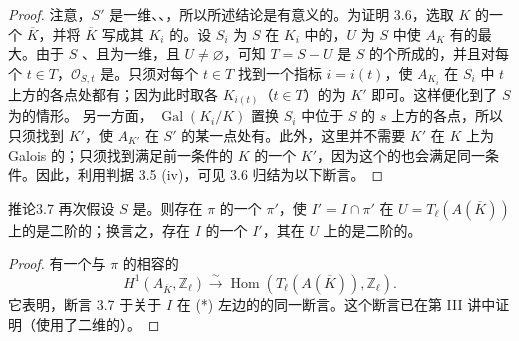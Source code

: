 \begin{proof}
注意，$S'$ 是一维、、，所以所述结论是有意义的。为证明 3.6，选取 $K$ 的一个 $\overline K$，并将 $\overline K$ 写成其 $K_i$ 的。设 $S_i$ 为 $S$ 在 $K_i$ 中的，$U$ 为 $S$ 中使 $A_K$ 有的最大。由于 $S$ 、且为一维，且 $U\ne\varnothing$，可知 $T=S-U$ 是 $S$ 的个所成的，并且对每个 $t\in T$，$\mathscr O_{S,t}$ 是。只须对每个 $t\in T$ 找到一个指标 $i=i(t)$，使 $A_{K_i}$ 在 $S_i$ 中 $t$ 上方的各点处都有；因为此时取各 $K_{i(t)}$（$t\in T$）的为 $K'$ 即可。这样便化到了 $S$ 为的情形。
另一方面， $\operatorname{Gal}(K_i/K)$ 置换 $S_i$ 中位于 $S$ 的 $s$ 上方的各点，所以只须找到 $K'$，使 $A_{K'}$ 在 $S'$ 的某一点处有。此外，这里并不需要 $K'$ 在 $K$ 上为 Galois 的；只须找到满足前一条件的 $K$ 的一个 $K'$，因为这个的也会满足同一条件。因此，利用判据 3.5 (iv)，可见 3.6 归结为以下断言。
\end{proof}
\begin{SGAresult}{推论}{3.7}
再次假设 $S$ 是。则存在 $\pi$ 的一个 $\pi'$，使 $I'=I\cap\pi'$ 在 $U=T_\ell(A(\overline K))$ 上的是二阶的；换言之，存在 $I$ 的一个 $I'$，其在 $U$ 上的是二阶的。
\end{SGAresult}
\begin{proof}
有一个与 $\pi$ 的相容的
\[
 H^1(A_{\overline K},\mathbb Z_\ell)\xrightarrow{\sim}
 \operatorname{Hom}(T_\ell(A(\overline K)),\mathbb Z_\ell). \tag{*}
\]
它表明，断言 3.7 于关于 $I$ 在 (*) 左边的的同一断言。这个断言已在第 III 讲中证明（使用了二维的）。
\end{proof}
